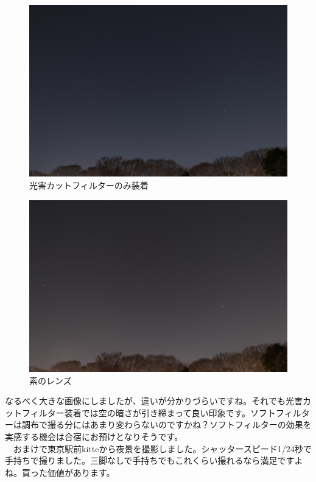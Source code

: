 \documentclass[a4paper.10pt]{jarticle}
\begin{document}
\begin{figure}[H]
\begin{center}
  \includegraphics[width=14cm]{cut.jpg}
\caption{光害カットフィルターのみ装着}
\label{}
\end{center}
\end{figure}
\begin{figure}[H]
\begin{center}
  \includegraphics[width=14cm]{normal.jpg}
\caption{素のレンズ}
\label{}
\end{center}
\end{figure}
なるべく大きな画像にしましたが、違いが分かりづらいですね。それでも光害カットフィルター装着では空の暗さが引き締まって良い印象です。ソフトフィルターは調布で撮る分にはあまり変わらないのですかね？ソフトフィルターの効果を実感する機会は合宿にお預けとなりそうです。\\
　おまけで東京駅前kitteから夜景を撮影しました。シャッタースピード1/24秒で手持ちで撮りました。三脚なしで手持ちでもこれくらい撮れるなら満足ですよね。買った価値があります。
\end{document}
